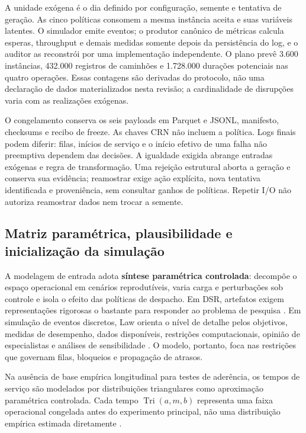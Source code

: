 \documentclass[
  12pt,
  oneside,
  a4paper,
  sumario=tradicional,
  brazil
]{abntex2}
\begin{document}
A unidade ex\'ogena \'e o dia definido por configura\c{c}\~ao, semente e tentativa de gera\c{c}\~ao. As cinco pol\'iticas consomem a mesma inst\^ancia aceita e suas vari\'aveis latentes. O simulador emite eventos; o produtor can\^onico de m\'etricas calcula esperas, throughput e demais medidas somente depois da persist\^encia do log, e o auditor as reconstr\'oi por uma implementa\c{c}\~ao independente. O plano prev\^e 3.600 inst\^ancias, 432.000 registros de caminh\~oes e 1.728.000 dura\c{c}\~oes potenciais nas quatro opera\c{c}\~oes. Essas contagens s\~ao derivadas do protocolo, n\~ao uma declara\c{c}\~ao de dados materializados nesta revis\~ao; a cardinalidade de disrup\c{c}\~oes varia com as realiza\c{c}\~oes ex\'ogenas.

O congelamento conserva os seis payloads em Parquet e JSONL, manifesto, checksums e recibo de freeze. As chaves CRN n\~ao incluem a pol\'itica. Logs finais podem diferir: filas, in\'icios de servi\c{c}o e o in\'icio efetivo de uma falha n\~ao preemptiva dependem das decis\~oes. A igualdade exigida abrange entradas ex\'ogenas e regra de transforma\c{c}\~ao. Uma rejei\c{c}\~ao estrutural aborta a gera\c{c}\~ao e conserva sua evid\^encia; reamostrar exige a\c{c}\~ao expl\'icita, nova tentativa identificada e proveni\^encia, sem consultar ganhos de pol\'iticas. Repetir I/O n\~ao autoriza reamostrar dados nem trocar a semente.

\subsection{Matriz param\'etrica, plausibilidade e inicializa\c{c}\~ao da simula\c{c}\~ao}
\label{sec:input-modeling}

A modelagem de entrada adota \textbf{s\'intese param\'etrica controlada}: decomp\~oe o espa\c{c}o operacional em cen\'arios reprodut\'iveis, varia carga e perturba\c{c}\~oes sob controle e isola o efeito das pol\'iticas de despacho. Em DSR, artefatos exigem representa\c{c}\~oes rigorosas o bastante para responder ao problema de pesquisa \parencite{hevnerDesignScienceInformation2004a}. Em simula\c{c}\~ao de eventos discretos, Law orienta o n\'ivel de detalhe pelos objetivos, medidas de desempenho, dados dispon\'iveis, restri\c{c}\~oes computacionais, opini\~ao de especialistas e an\'alises de sensibilidade \parencite[Sec.~5.2, p.~249--251]{lawSimulationModelingAnalysis2015}. O modelo, portanto, foca nas restri\c{c}\~oes que governam filas, bloqueios e propaga\c{c}\~ao de atrasos.

Na aus\^encia de base emp\'irica longitudinal para testes de ader\^encia, os tempos de servi\c{c}o s\~ao modelados por distribui\c{c}\~oes triangulares como aproxima\c{c}\~ao param\'etrica controlada. Cada tempo $\operatorname{Tri}(a,m,b)$ representa uma faixa operacional congelada antes do experimento principal, n\~ao uma distribui\c{c}\~ao emp\'irica estimada diretamente \parencite[p.~376--377]{lawSimulationModelingAnalysis2015}.
\end{document}
